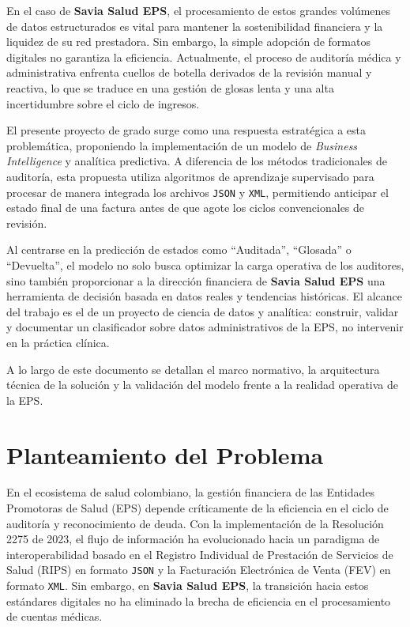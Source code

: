 \documentclass[12pt,letterpaper]{report}
\begin{document}
En el caso de \textbf{Savia Salud EPS}, el procesamiento de estos grandes volúmenes de datos estructurados es vital para mantener la sostenibilidad financiera y la liquidez de su red prestadora. Sin embargo, la simple adopción de formatos digitales no garantiza la eficiencia. Actualmente, el proceso de auditoría médica y administrativa enfrenta cuellos de botella derivados de la revisión manual y reactiva, lo que se traduce en una gestión de glosas lenta y una alta incertidumbre sobre el ciclo de ingresos.

El presente proyecto de grado surge como una respuesta estratégica a esta problemática, proponiendo la implementación de un modelo de \textit{Business Intelligence} y analítica predictiva. A diferencia de los métodos tradicionales de auditoría, esta propuesta utiliza algoritmos de aprendizaje supervisado para procesar de manera integrada los archivos \texttt{JSON} y \texttt{XML}, permitiendo anticipar el estado final de una factura antes de que agote los ciclos convencionales de revisión.

Al centrarse en la predicción de estados como ``Auditada'', ``Glosada'' o ``Devuelta'', el modelo no solo busca optimizar la carga operativa de los auditores, sino también proporcionar a la dirección financiera de \textbf{Savia Salud EPS} una herramienta de decisión basada en datos reales y tendencias históricas. El alcance del trabajo es el de un proyecto de ciencia de datos y analítica: construir, validar y documentar un clasificador sobre datos administrativos de la EPS, no intervenir en la práctica clínica.

A lo largo de este documento se detallan el marco normativo, la arquitectura técnica de la solución y la validación del modelo frente a la realidad operativa de la EPS.

\clearpage
\chapter{Planteamiento del Problema}

En el ecosistema de salud colombiano, la gestión financiera de las Entidades Promotoras de Salud (EPS) depende críticamente de la eficiencia en el ciclo de auditoría y reconocimiento de deuda. Con la implementación de la Resolución 2275 de 2023, el flujo de información ha evolucionado hacia un paradigma de interoperabilidad basado en el Registro Individual de Prestación de Servicios de Salud (RIPS) en formato \texttt{JSON} y la Facturación Electrónica de Venta (FEV) en formato \texttt{XML}. Sin embargo, en \textbf{Savia Salud EPS}, la transición hacia estos estándares digitales no ha eliminado la brecha de eficiencia en el procesamiento de cuentas médicas.
\end{document}
